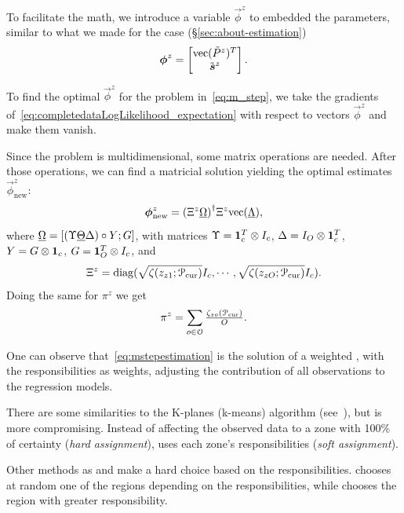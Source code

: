 \documentclass[../main.tex]{subfiles}
\begin{document}
To facilitate the math, we introduce a variable $\vec{\phi}^{z}$ to embedded the parameters, similar to what we made for the \RLS{} case (\S\ref{sec:about-estimation})
\begin{equation}
  \boldsymbol{\phi}^{z}=\left[
      \begin{matrix}
      \mathrm{vec} (\tilde{P}^{z})^{T}\\\tilde{\boldsymbol{s}}^{z}
      \end{matrix}
    \right].
\end{equation}

To find the optimal $\vec{\phi}^{z}$ for the problem in~\eqref{eq:m_step}, we
take the gradients of~\eqref{eq:completedataLogLikelihood_expectation} with respect to vectors $\vec{\phi}^{z}$ and make them vanish.

Since the problem is multidimensional, some matrix operations are needed.
After those operations, we can find a matricial solution yielding the optimal estimates $\vec{\phi}^{z}_{\mathrm{new}}$:
\begin{equation}
  \label{eq:mstepestimation}
  \boldsymbol{\phi}^{z}_{\mathrm{new}}={(\Xi^{z}\underline{\Omega})}^{\dagger}\Xi^{z}\mathrm{vec} (\underline{\Lambda}),
\end{equation}
where
${\underline{\Omega}=[(\Upsilon \underline{\Theta}\Delta)\circ Y;G]}$,
with matrices
${\Upsilon=\mathbf{1}_{c}^{T}\otimes I_{c}}$,
${\Delta=I_{O}\otimes\mathbf{1}_{c}^{T}}$,
${Y=G\otimes\mathbf{1}_{c}}$,
${G=\mathbf{1}_{O}^{T}\otimes I_{c}}$,
and
\[{\Xi^{z}={\operatorname{diag}(\sqrt{{\zeta(z_{z1};\mathcal{P}_{\mathrm{cur}})}}I_{c},\cdots,\sqrt{{\zeta(z_{zO};\mathcal{P}_{\mathrm{cur}})}}I_{c})}}.\]
Doing the same for $\pi^{z}$ we get
\begin{equation*}
  \label{eq:3}
  \pi^{z}=\sum\limits_{o\in\mathcal{O}}\tfrac{\zeta_{zo}(\mathcal{P}_{\mathrm{cur}})}{O}.
\end{equation*}

One can observe that~\eqref{eq:mstepestimation} is the solution of a weighted \LS{}, with the responsibilities as weights, adjusting the contribution of all observations to the regression models.

There are some similarities to the K-planes (k-means) algorithm (see~\cite{BradleyMangasarian2000}), but \EM{} is more compromising.
Instead of affecting the observed data to a zone with 100\% of certainty (\emph{hard assignment}), \EM{} uses each zone's responsibilities (\emph{soft assignment}).

Other methods as \sEM{} and \CEM{} make a hard choice based on the responsibilities.
\sEM{} chooses at random one of the regions depending on the responsibilities, while \CEM{} chooses the region with greater responsibility.
\end{document}
